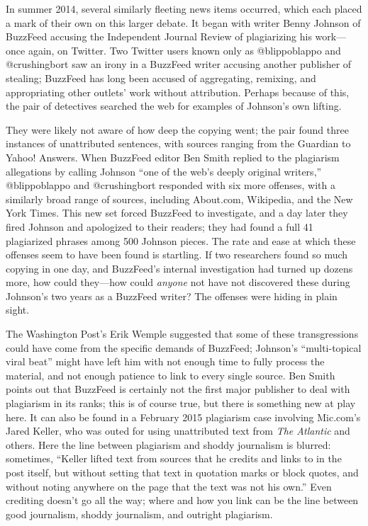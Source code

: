 In summer 2014, several similarly fleeting news items occurred, which each placed a mark of their own on this larger debate. It began with writer Benny Johnson of BuzzFeed accusing the Independent Journal Review of plagiarizing his work---once again, on Twitter.\autocite{johnson_repeat_2014} Two Twitter users known only as @blippoblappo and @crushingbort saw an irony in a BuzzFeed writer accusing another publisher of stealing; BuzzFeed has long been accused of aggregating, remixing, and appropriating other outlets' work without attribution.\autocites[See, e.g.,][]{manjoo_how_2012}{chen_remix_2012} Perhaps because of this, the pair of detectives searched the web for examples of Johnson's own lifting.

They were likely not aware of how deep the copying went; the pair found three instances of unattributed sentences, with sources ranging from the Guardian to Yahoo! Answers.\autocite{blippoblappo_3_2014} When BuzzFeed editor Ben Smith replied to the plagiarism allegations by calling Johnson ``one of the web's deeply original writers,'' @blippoblappo and @crushingbort responded with six more offenses, with a similarly broad range of sources, including About.com, Wikipedia, and the New York Times.\autocite{blippoblappo_more_2014} This new set forced BuzzFeed to investigate, and a day later they fired Johnson and apologized to their readers; they had found a full 41 plagiarized phrases among 500 Johnson pieces.\autocite{smith_editors_2014} The rate and ease at which these offenses seem to have been found is startling. If two researchers found so much copying in one day, and BuzzFeed's internal investigation had turned up dozens more, how could they---how could \emph{anyone} not have not discovered these during Johnson's two years as a BuzzFeed writer? The offenses were hiding in plain sight.

The Washington Post's Erik Wemple suggested that some of these transgressions could have come from the specific demands of BuzzFeed; Johnson's ``multi-topical viral beat'' might have left him with not enough time to fully process the material, and not enough patience to link to every single source.\autocite{wemple_ravages_2014} Ben Smith points out that BuzzFeed is certainly not the first major publisher to deal with plagiarism in its ranks; this is of course true, but there is something new at play here. It can also be found in a February 2015 plagiarism case involving Mic.com's Jared Keller, who was outed for using unattributed text from \emph{The Atlantic} and others. Here the line between plagiarism and shoddy journalism is blurred: sometimes, ``Keller lifted text from sources that he credits and links to in the post itself, but without setting that text in quotation marks or block quotes, and without noting anywhere on the page that the text was not his own.''\autocite{trotter_plagiarist_2015} Even crediting doesn't go all the way; where and how you link can be the line between good journalism, shoddy journalism, and outright plagiarism.

